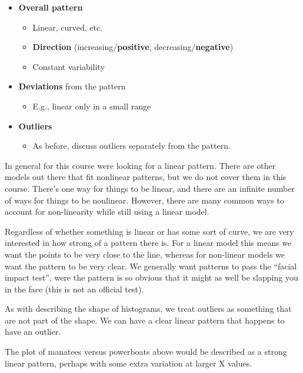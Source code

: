 \documentclass[
  letterpaper,
  DIV=11,
  numbers=noendperiod]{scrreprt}
\providecommand{\tightlist}{%
  \setlength{\itemsep}{0pt}\setlength{\parskip}{0pt}}\usepackage{longtable,booktabs,array}
\begin{document}
\begin{itemize}
\tightlist
\item
  \textbf{Overall pattern}

  \begin{itemize}
  \tightlist
  \item
    Linear, curved, etc.
  \item
    \textbf{Direction} (increasing/\textbf{positive},
    decreasing/\textbf{negative})
  \item
    Constant variability
  \end{itemize}
\item
  \textbf{Deviations} from the pattern

  \begin{itemize}
  \tightlist
  \item
    E.g., linear only in a small range
  \end{itemize}
\item
  \textbf{Outliers}

  \begin{itemize}
  \tightlist
  \item
    As before, discuss outliers separately from the pattern.
  \end{itemize}
\end{itemize}

In general for this course were looking for a linear pattern. There are
other models out there that fit nonlinear patterns, but we do not cover
them in this course. There's one way for things to be linear, and there
are an infinite number of ways for things to be nonlinear. However,
there are many common ways to account for non-linearity while still
using a linear model.

Regardless of whether something is linear or has some sort of curve, we
are very interested in how strong of a pattern there is. For a linear
model this means we want the points to be very close to the line,
whereas for non-linear models we want the pattern to be very clear. We
generally want patterns to pass the ``facial impact test'', were the
pattern is so obvious that it might as well be slapping you in the face
(this is not an official test).

As with describing the shape of histograms, we treat outliers as
something that are not part of the shape. We can have a clear linear
pattern that happens to have an outlier.

The plot of manatees versus powerboats above would be described as a
strong linear pattern, perhaps with some extra variation at larger X
values.
\end{document}
